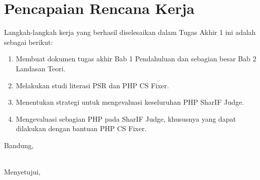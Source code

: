 \documentclass[a4paper,twoside]{article}
\begin{document}
		\section{Pencapaian Rencana Kerja}
		Langkah-langkah kerja yang berhasil diselesaikan dalam Tugas Akhir 1 ini adalah sebagai berikut:
		\begin{enumerate}
			\item Membuat dokumen tugas akhir Bab 1 Pendahuluan dan sebagian besar Bab 2 Landasan Teori. 
			\item Melakukan studi literasi PSR dan PHP CS Fixer.
			\item Menentukan strategi untuk mengevaluasi keseluruhan PHP SharIF Judge.
			\item Mengevaluasi sebagian PHP pada SharIF Judge, khususnya yang dapat dilakukan dengan bantuan PHP CS Fixer.
		\end{enumerate}
		
		
		\vspace{1cm}
		\centering Bandung, \tanggal\\
		\vspace{2cm} \nama \\ 
		\vspace{1cm}
		
		Menyetujui, \\
	
\end{document}
